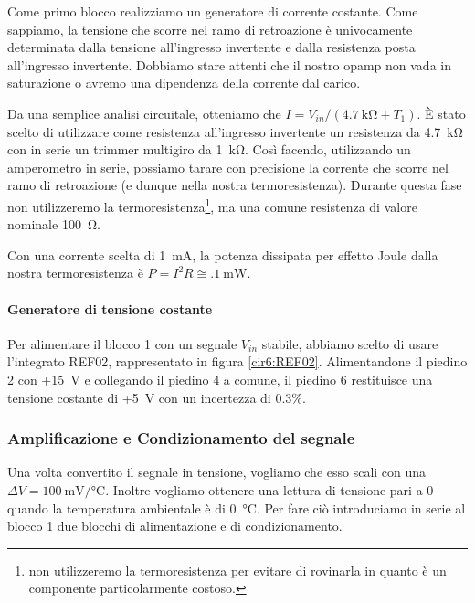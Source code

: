 Come primo blocco realizziamo un generatore di corrente costante.
Come sappiamo, la tensione che scorre nel ramo di retroazione è univocamente determinata dalla tensione all'ingresso invertente e dalla resistenza posta all'ingresso invertente.
Dobbiamo stare attenti che il nostro opamp non vada in saturazione o avremo una dipendenza della corrente dal carico.

Da una semplice analisi circuitale, otteniamo che $I=V_{in}/(\SI{4.7}{\kohm}+T_1)$.
È stato scelto di utilizzare come resistenza all'ingresso invertente un resistenza da \SI{4.7}{\kilo\ohm} con in serie un trimmer multigiro da \SI{1}{\kilo\ohm}.
Così facendo, utilizzando un amperometro in serie, possiamo tarare con precisione la corrente che scorre nel ramo di retroazione (e dunque nella nostra termoresistenza).
Durante questa fase non utilizzeremo la termoresistenza\footnote{non utilizzeremo la termoresistenza per evitare di rovinarla in quanto è un componente particolarmente costoso.}, ma una comune resistenza di valore nominale \SI{100}{\ohm}.

Con una corrente scelta di \SI{1}{\milli\ampere}, la potenza dissipata per effetto Joule dalla nostra termoresistenza è $P=I^2 R \cong \SI{.1}{\mW}$.
%

\paragraph{Generatore di tensione costante\newline}

Per alimentare il blocco 1 con un segnale $V_{in}$ stabile, abbiamo scelto di usare l'integrato REF02, rappresentato in figura \ref{cir6:REF02}.
Alimentandone il piedino 2 con +\SI{15}{\volt} e collegando il piedino 4 a comune, il piedino 6 restituisce una tensione costante di +\SI{5}{\volt} con un incertezza di \num{0.3}$\%$.
\newpage

\subsubsection{Amplificazione e Condizionamento del segnale}
Una volta convertito il segnale in tensione, vogliamo che esso scali con una $\Delta V=\SI{100}{\milli\volt}/\si{\celsius}$.
Inoltre vogliamo ottenere una lettura di tensione pari a \num{0} quando la temperatura ambientale è di \SI{0}{\celsius}.
Per fare ciò introduciamo in serie al blocco 1 due blocchi di alimentazione e di condizionamento.

